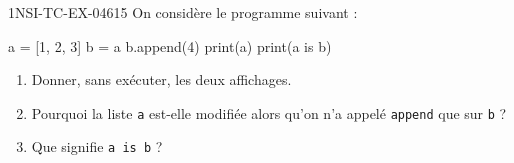 \begin{exercice}{1NSI-TC-EX-046}{1}{5}
On considère le programme suivant :
\begin{python}
a = [1, 2, 3]
b = a
b.append(4)
print(a)
print(a is b)
\end{python}
\begin{enumerate}
  \item Donner, sans exécuter, les deux affichages.
  \item Pourquoi la liste \lstinline{a} est-elle modifiée alors qu'on n'a appelé
        \lstinline{append} que sur \lstinline{b} ?
  \item Que signifie \lstinline{a is b} ?
\end{enumerate}
\end{exercice}
